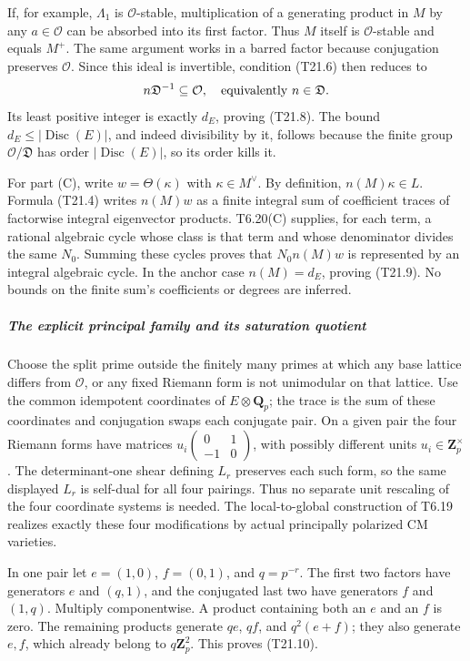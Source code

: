\documentclass[11pt,a4paper]{article}
\theoremstyle{definition}
\begin{document}
If, for example, \(\Lambda_1\) is \(\mathcal O\)-stable, multiplication of a generating product in \(M\) by any \(a\in\mathcal O\) can be absorbed into its first factor. Thus \(M\) itself is \(\mathcal O\)-stable and equals \(M^+\). The same argument works in a barred factor because conjugation preserves \(\mathcal O\). Since this ideal is invertible, condition (T21.6) then reduces to \[
 n\mathfrak D^{-1}\subseteq\mathcal O,
 \quad\hbox{equivalently }n\in\mathfrak D.
\] Its least positive integer is exactly \(d_E\), proving (T21.8). The bound \(d_E\le|\operatorname{Disc}(E)|\), and indeed divisibility by it, follows because the finite group \(\mathcal O/\mathfrak D\) has order \(|\operatorname{Disc}(E)|\), so its order kills it.

For part (C), write \(w=\Theta(\kappa)\) with \(\kappa\in M^\vee\). By definition, \(n(M)\kappa\in L\). Formula (T21.4) writes \(n(M)w\) as a finite integral sum of coefficient traces of factorwise integral eigenvector products. T6.20(C) supplies, for each term, a rational algebraic cycle whose class is that term and whose denominator divides the same \(N_0\). Summing these cycles proves that \(N_0n(M)w\) is represented by an integral algebraic cycle. In the anchor case \(n(M)=d_E\), proving (T21.9). No bounds on the finite sum's coefficients or degrees are inferred.

\subparagraph{The explicit principal family and its saturation quotient}\label{the-explicit-principal-family-and-its-saturation-quotient}

Choose the split prime outside the finitely many primes at which any base lattice differs from \(\mathcal O\), or any fixed Riemann form is not unimodular on that lattice. Use the common idempotent coordinates of \(E\otimes\mathbf Q_p\); the trace is the sum of these coordinates and conjugation swaps each conjugate pair. On a given pair the four Riemann forms have matrices \(u_i\left(\begin{smallmatrix}0&1\\-1&0\end{smallmatrix}\right)\), with possibly different units \(u_i\in\mathbf Z_p^\times\). The determinant-one shear defining \(L_r\) preserves each such form, so the same displayed \(L_r\) is self-dual for all four pairings. Thus no separate unit rescaling of the four coordinate systems is needed. The local-to-global construction of T6.19 realizes exactly these four modifications by actual principally polarized CM varieties.

In one pair let \(e=(1,0)\), \(f=(0,1)\), and \(q=p^{-r}\). The first two factors have generators \(e\) and \((q,1)\), and the conjugated last two have generators \(f\) and \((1,q)\). Multiply componentwise. A product containing both an \(e\) and an \(f\) is zero. The remaining products generate \(qe\), \(qf\), and \(q^2(e+f)\); they also generate \(e,f\), which already belong to \(q\mathbf Z_p^2\). This proves (T21.10).
\end{document}
